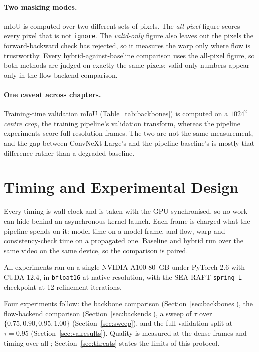\documentclass[report.tex]{subfiles}
\begin{document}
\paragraph{Two masking modes.} mIoU is computed over two different sets of
pixels. The \emph{all-pixel} figure scores every pixel that is not
\texttt{ignore}. The \emph{valid-only} figure also leaves out the pixels the
forward-backward check has rejected, so it measures the warp only where flow
is trustworthy. Every hybrid-against-baseline comparison uses the all-pixel
figure, so both methods are judged on exactly the same pixels; valid-only
numbers appear only in the flow-backend comparison.

\paragraph{One caveat across chapters.} Training-time validation mIoU
(Table~\ref{tab:backbones}) is computed on a $1024^2$ \emph{centre crop}, the
training pipeline's validation transform, whereas the pipeline experiments
score full-resolution frames. The two are not the same measurement, and the gap
between ConvNeXt-Large's \MIoUConvnextLarge{} and the pipeline baseline's
\BaseMIoU{} is mostly that difference rather than a degraded baseline.

\section{Timing and Experimental Design}
\label{sec:timing}

Every timing is wall-clock and is taken with the GPU synchronised, so no work
can hide behind an asynchronous kernel launch. Each frame is charged what the
pipeline spends on it: model time on a model frame, and flow, warp and
consistency-check time on a propagated one. Baseline and hybrid run over the
same video on the same device, so the comparison is paired.

All experiments ran on a single NVIDIA A100 \SI{80}{GB} under PyTorch 2.6
with CUDA 12.4, in \texttt{bfloat16} at native resolution, with the SEA-RAFT
\texttt{spring-L} checkpoint at 12 refinement iterations.

Four experiments follow: the backbone comparison
(Section~\ref{sec:backbones}), the flow-backend comparison
(Section~\ref{sec:backends}), a sweep of $\tau$ over
$\{0.75, 0.90, 0.95, 1.00\}$ (Section~\ref{sec:sweep}), and the full
validation split at $\tau = 0.95$ (Section~\ref{sec:valresults}). Quality is
measured at the \NumGT{} dense frames and timing over all \NumFrames{};
Section~\ref{sec:threats} states the limits of this protocol.
\end{document}
